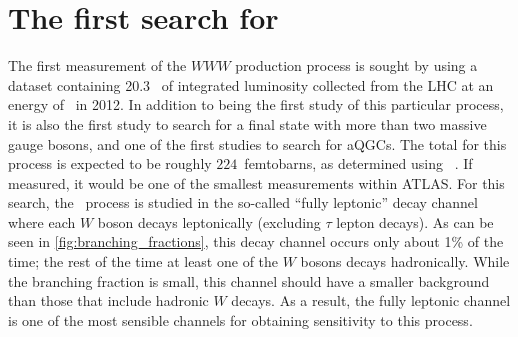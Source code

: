 \chapter{The first search for \wwwlll}
\label{sec:www}





The first measurement of the $WWW$ production process
is sought by using a dataset containing 20.3 \ifb~of integrated luminosity
collected from the LHC at an energy of \energy~in 2012.
In addition to being the first study of this particular process,
it is also the first study to search for a final state with more 
than two massive gauge bosons, and one of the first studies
to search for aQGCs.
The total \xsec for this process is expected
to be roughly $224$~femtobarns, as determined using 
\madgraph~\cite{MadGraph}. If measured, it 
would be one of the smallest \xsec measurements
within ATLAS. %
For this search, the \www~process is studied in the 
so-called ``fully leptonic'' decay channel
where each $W$ boson decays leptonically (excluding $\tau$ lepton decays).
As can be seen in \fig\ref{fig:branching_fractions},
this decay channel occurs only about 1\% of the time;
the rest of the time
at least one of the $W$ bosons decays hadronically.
While the branching fraction is small,
this channel should have a smaller background than those 
that include hadronic $W$ decays.
As a result, the fully leptonic channel
is one of the most sensible channels
for obtaining sensitivity to this process.


